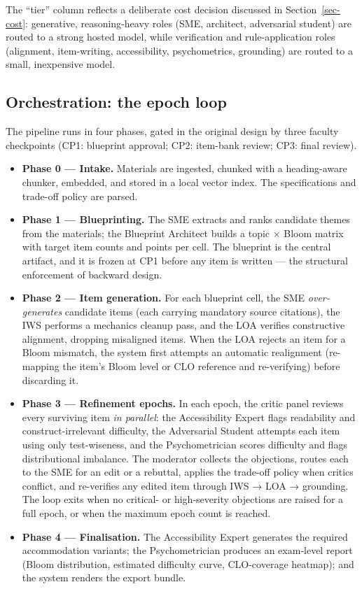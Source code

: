 \documentclass[
  11pt,
  letterpaper,
]{article}
\providecommand{\tightlist}{%
  \setlength{\itemsep}{0pt}\setlength{\parskip}{0pt}}
\begin{document}
The ``tier'' column reflects a deliberate cost decision discussed in
Section~\ref{sec-cost}: generative, reasoning-heavy roles (SME,
architect, adversarial student) are routed to a strong hosted model,
while verification and rule-application roles (alignment, item-writing,
accessibility, psychometrics, grounding) are routed to a small,
inexpensive model.

\subsection{Orchestration: the epoch
loop}\label{orchestration-the-epoch-loop}

The pipeline runs in four phases, gated in the original design by three
faculty checkpoints (CP1: blueprint approval; CP2: item-bank review;
CP3: final review).

\begin{itemize}
\tightlist
\item
  \textbf{Phase 0 --- Intake.} Materials are ingested, chunked with a
  heading-aware chunker, embedded, and stored in a local vector index.
  The specifications and trade-off policy are parsed.
\item
  \textbf{Phase 1 --- Blueprinting.} The SME extracts and ranks
  candidate themes from the materials; the Blueprint Architect builds a
  topic × Bloom matrix with target item counts and points per cell. The
  blueprint is the central artifact, and it is frozen at CP1 before any
  item is written --- the structural enforcement of backward design.
\item
  \textbf{Phase 2 --- Item generation.} For each blueprint cell, the SME
  \emph{over-generates} candidate items (each carrying mandatory source
  citations), the IWS performs a mechanics cleanup pass, and the LOA
  verifies constructive alignment, dropping misaligned items. When the
  LOA rejects an item for a Bloom mismatch, the system first attempts an
  automatic realignment (re-mapping the item's Bloom level or CLO
  reference and re-verifying) before discarding it.
\item
  \textbf{Phase 3 --- Refinement epochs.} In each epoch, the critic
  panel reviews every surviving item \emph{in parallel}: the
  Accessibility Expert flags readability and construct-irrelevant
  difficulty, the Adversarial Student attempts each item using only
  test-wiseness, and the Psychometrician scores difficulty and flags
  distributional imbalance. The moderator collects the objections,
  routes each to the SME for an edit or a rebuttal, applies the
  trade-off policy when critics conflict, and re-verifies any edited
  item through IWS → LOA → grounding. The loop exits when no critical-
  or high-severity objections are raised for a full epoch, or when the
  maximum epoch count is reached.
\item
  \textbf{Phase 4 --- Finalisation.} The Accessibility Expert generates
  the required accommodation variants; the Psychometrician produces an
  exam-level report (Bloom distribution, estimated difficulty curve,
  CLO-coverage heatmap); and the system renders the export bundle.
\end{itemize}
\end{document}
